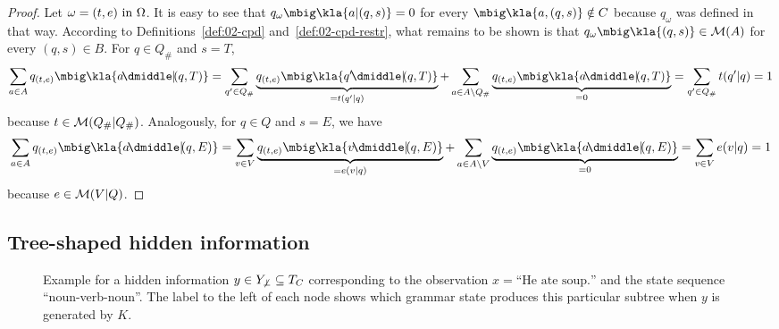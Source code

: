 \begin{proof}
 Let $\omega=(t,e)\text{ in }\Omega$. It is easy to see that
 $q_\omega\mbig\kla{a|(q,s)} = 0$ for every $\mbig\kla{a,(q,s)}\notin C$
 because $q_\omega$ was defined in that way. According to
 Definitions~\ref{def:02-cpd} and~\ref{def:02-cpd-restr}, what remains to be
 shown is that $q_\omega\mbig\kla{(q,s)}\in\um(A)$ for every $(q,s)\in B$. For
 $q\in Q_\#$ and $s = T$,
 \[
  \sum_{a\in A} q_{(t,e)}\mbig\kla{a\npipe(q,T)}
  = \sum_{q'\in Q_\#} \underbrace{q_{(t,e)}\mbig\kla{q'\npipe(q,T)}}_{=t(q'|q)}
  + \sum_{a\in A\setminus Q_\#} \underbrace{q_{(t,e)}\mbig\kla{a\npipe(q,T)}}_{=0}
  = \sum_{q'\in Q_\#} t(q'|q) = 1
 \]
 because $t\in\mathcal M(Q_\#|Q_\#)$. Analogously, for $q\in Q$ and $s = E$, we have
 \[
  \sum_{a\in A} q_{(t,e)}\mbig\kla{a\npipe(q,E)}
  = \sum_{v\in V} \underbrace{q_{(t,e)}\mbig\kla{v\npipe(q,E)}}_{=e(v|q)}
  + \sum_{a\in A\setminus V} \underbrace{q_{(t,e)}\mbig\kla{a\npipe(q,E)}}_{=0}
  = \sum_{v\in V} e(v|q) = 1
 \]
 because $e\in\mathcal M(V|Q)$.
\end{proof}

\subsection{Tree-shaped hidden information}

\begin{figure}[t!]
 \centering
 \caption{
  Example for a hidden information $y\in Y_{\not\bot}\subseteq T_C$
  corresponding to the observation $x = \text{``He ate soup.''}$ and the state
  sequence ``noun-verb-noun''. The label to the left of each node shows which
  grammar state produces this particular subtree when $y$ is generated by $K$.
 \label{fig:03-example-y}}
\end{figure}

